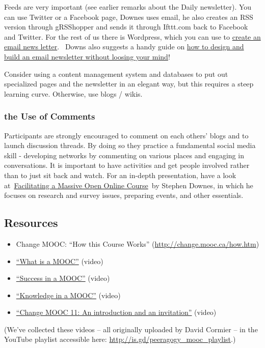 Feeds are very important (see earlier remarks about the Daily
newsletter). You can use Twitter or a Facebook page, Downes uses email,
he also creates an RSS version through gRSShopper and sends it through
Ifttt.com back to Facebook and Twitter. For the rest of us there is
Wordpress, which you can use to
\href{http://www.wpbeginner.com/wp-tutorials/create-a-free-email-newsletter-service-using-wordpress/\%20}{create
an email news letter}.~ Downs also suggests a handy guide on
\href{http://www.smashingmagazine.com/2010/01/19/design-and-build-an-email-newsletter-without-losing-your-mind/}{how
to design and build an email newsletter without loosing your mind}!

Consider using a content management system and databases to put out
specialized pages and the newsletter in an elegant way, but this
requires a steep learning curve. Otherwise, use blogs / wikis.

\subsubsection{the Use of Comments}\label{the-use-of-comments}

Participants are strongly encouraged to comment on each others' blogs
and to launch discussion threads. By doing so they practice a
fundamental social media skill - developing networks by commenting on
various places and engaging in conversations. It is important to have
activities and get people involved rather than to just sit back and
watch. For an in-depth presentation, have a look
at~\href{http://www.downes.ca/presentation/290}{Facilitating a Massive
Open Online Course}~by Stephen Downes, in which he focuses on research
and survey issues, preparing events, and other essentials.

\subsection{Resources}\label{resources}

\begin{itemize}
\itemsep1pt\parskip0pt
\item
  Change MOOC: ``How this Course Works'' (\url{http://change.mooc.ca/how.htm})
\item
  \href{http://www.youtube.com/watch?v=eW3gMGqcZQc}{``What is a MOOC''} (video)
\item
  \href{http://www.youtube.com/watch?v=r8avYQ5ZqM0}{``Success in a MOOC''} (video)
\item
  \href{http://www.youtube.com/watch?v=bWKdhzSAAG0}{``Knowledge in a MOOC''} (video)
\item
  \href{http://www.youtube.com/watch?v=mqnyhLfNH3I}{``Change MOOC 11: An introduction and an invitation''} (video)
\end{itemize}

\noindent (We've collected these videos -- all originally uploaded by David Cormier -- in the YouTube playlist accessible here: \url{http://is.gd/peeragogy_mooc_playlist}.)
